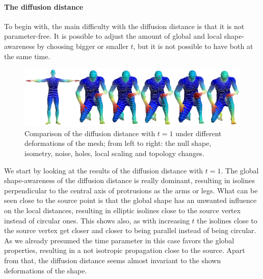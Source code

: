 \paragraph{The diffusion distance}
To begin with, the main difficulty with the diffusion distance is that it is not parameter-free.
It is possible to adjust the amount of global and local shape-awareness by choosing bigger or smaller $t$, but it is not possible to have both at the same time.
\begin{figure}[h]
	\centering
	\includegraphics[width = \textwidth]{../results/diffusion_big_isolines}
	\caption{Comparison of the diffusion distance with $t = 1$ under different deformations of the mesh; from left to right: the null shape, isometry, noise, holes, local scaling and topology changes.}
	\label{fig:diffusion_b_isolines}
\end{figure}
We start by looking at the results of the diffusion distance with $t=1$.
The global shape-awareness of the diffusion distance is really dominant, resulting in isolines perpendicular to the central axis of protrusions as the arms or legs.
What can be seen close to the source point is that the global shape has an unwanted influence on the local distances, resulting in elliptic isolines close to the source vertex instead of circular ones.
This shows also, as with increasing $t$ the isolines close to the source vertex get closer and closer to being parallel instead of being circular.
As we already presumed the time parameter in this case favors the global properties, resulting in a not isotropic propagation close to the source.
Apart from that, the diffusion distance seems almost invariant to the shown deformations of the shape.

